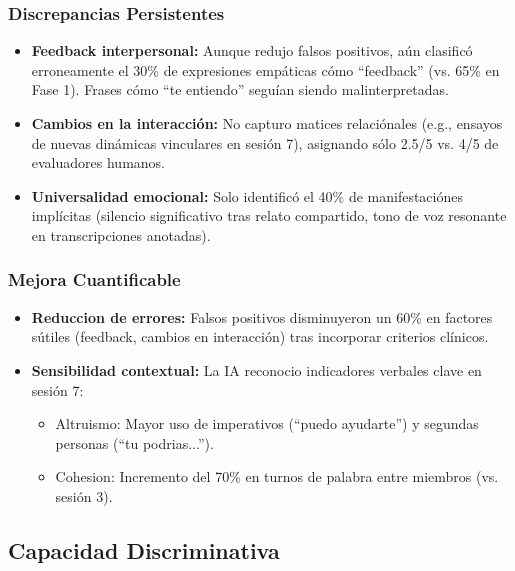 \documentclass[12pt,a4paper,twoside]{book}
\begin{document}
\subsubsection{Discrepancias Persistentes}

\begin{itemize}
    \item \textbf{Feedback interpersonal:} Aunque redujo falsos positivos, aún clasificó erroneamente el 30\% de expresiones empáticas cómo ``feedback'' (vs. 65\% en Fase 1). Frases cómo ``te entiendo'' seguían siendo malinterpretadas.
    
    \item \textbf{Cambios en la interacción:} No capturo matices relaciónales (e.g., ensayos de nuevas dinámicas vinculares en sesión 7), asignando sólo 2.5/5 vs. 4/5 de evaluadores humanos.
    
    \item \textbf{Universalidad emocional:} Solo identificó el 40\% de manifestaciónes implícitas (silencio significativo tras relato compartido, tono de voz resonante en transcripciones anotadas).
\end{itemize}

\subsubsection{Mejora Cuantificable}

\begin{itemize}
    \item \textbf{Reduccion de errores:} Falsos positivos disminuyeron un 60\% en factores sútiles (feedback, cambios en interacción) tras incorporar criterios clínicos.
    
    \item \textbf{Sensibilidad contextual:} La IA reconocio indicadores verbales clave en sesión 7:
    \begin{itemize}
        \item Altruismo: Mayor uso de imperativos (``puedo ayudarte'') y segundas personas (``tu podrias...'').
        \item Cohesion: Incremento del 70\% en turnos de palabra entre miembros (vs. sesión 3).
    \end{itemize}
\end{itemize}

\subsection{Capacidad Discriminativa}
\end{document}
